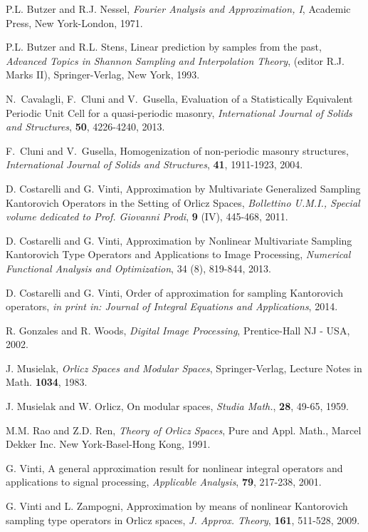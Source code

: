 \documentclass[11pt,a4paper]{article}
\begin{document}
\begin{thebibliography}{99}
{ P.L. Butzer and R.J. Nessel, {\em Fourier Analysis and
Approximation, I}, Academic Press, New York-London, 1971.

 P.L. Butzer and R.L. Stens, Linear prediction by
samples from the past, {\em Advanced Topics in Shannon Sampling and
Interpolation Theory}, (editor R.J. Marks II), Springer-Verlag, New
York, 1993.

 N.~Cavalagli, F.~Cluni and V.~Gusella, Evaluation of a Statistically Equivalent Periodic Unit Cell for a quasi-periodic masonry, {\em International Journal of Solids and Structures}, {\bf 50}, 4226-4240, 2013.

 F.~Cluni and V.~Gusella, Homogenization of non-periodic masonry structures, {\em International Journal of Solids and Structures}, {\bf 41}, 1911-1923, 2004. 

 D. Costarelli and G. Vinti, Approximation by Multivariate Generalized Sampling Kantorovich Operators in the Setting of Orlicz Spaces, {\em Bollettino U.M.I., Special volume dedicated to Prof. Giovanni Prodi}, {\bf 9} (IV), 445-468, 2011.

 D. Costarelli and G. Vinti, Approximation by Nonlinear Multivariate Sampling Kantorovich Type Operators and Applications to Image Processing, {\em Numerical Functional Analysis and Optimization}, 34 (8), 819-844, 2013.

 D. Costarelli and G. Vinti, Order of approximation for sampling Kantorovich operators, {\em in print in: Journal of Integral Equations and Applications}, 2014.

 R. Gonzales and R. Woods, \emph{Digital Image Processing}, Prentice-Hall NJ - USA, 2002.

 J. Musielak, {\em Orlicz Spaces and Modular Spaces}, Springer-Verlag, Lecture Notes in Math. {\bf 1034}, 1983.

   J. Musielak and W. Orlicz, On modular spaces, {\em Studia Math.}, {\bf 28}, 49-65, 1959.

 M.M. Rao and Z.D. Ren, {\em Theory of Orlicz Spaces}, Pure and Appl. Math., Marcel Dekker Inc. New York-Basel-Hong Kong, 1991.

 G. Vinti, A general approximation result for nonlinear integral operators and applications to signal processing, {\em Applicable Analysis}, {\bf 79}, 217-238, 2001.

 G. Vinti and L. Zampogni, Approximation by means of nonlinear Kantorovich sampling type operators in Orlicz spaces, {\em J. Approx. Theory}, {\bf 161}, 511-528, 2009.

}
\end{thebibliography}
\end{document}
